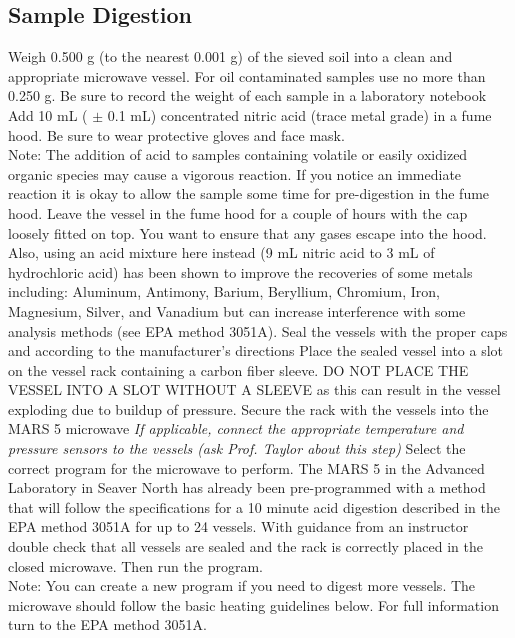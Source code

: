 \documentclass[12pt]{../SOP3_beta}\usepackage[]{graphicx}\usepackage[]{color}
\begin{document}
\subsection{Sample Digestion}

  \NP	Weigh 0.500 g (to the nearest 0.001 g) of the sieved soil into a clean and appropriate microwave vessel. For oil contaminated samples use no more than 0.250 g. Be sure to record the weight of each sample in a laboratory notebook
  \NP	Add 10 mL ( $\pm$ 0.1 mL) concentrated nitric acid (trace metal grade) in a fume hood. Be sure to wear protective gloves and face mask. \\ Note: The addition of acid to samples containing volatile or easily oxidized organic species may cause a vigorous reaction. If you notice an immediate reaction it is okay to allow the sample some time for pre-digestion in the fume hood. Leave the vessel in the fume hood for a couple of hours with the cap loosely fitted on top. You want to ensure that any gases escape into the hood. Also, using an acid mixture here instead (9 mL nitric acid to 3 mL of hydrochloric acid) has been shown to improve the recoveries of some metals including: Aluminum, Antimony, Barium, Beryllium, Chromium, Iron, Magnesium, Silver, and Vanadium but can increase interference with some analysis methods (see EPA method 3051A). 
  \NP Seal the vessels with the proper caps and according to the manufacturer’s directions
  \NP Place the sealed vessel into a slot on the vessel rack containing a carbon fiber sleeve. DO NOT PLACE THE VESSEL INTO A SLOT WITHOUT A SLEEVE as this can result in the vessel exploding due to buildup of pressure. 
  \NP Secure the rack with the vessels into the MARS 5 microwave
  \NP \emph{If applicable, connect the appropriate temperature and pressure sensors to the vessels (ask Prof. Taylor about this step)}
  \NP Select the correct program for the microwave to perform. The MARS 5 in the Advanced Laboratory in Seaver North has already been pre-programmed with a method that will follow the specifications for a 10 minute acid digestion described in the EPA method 3051A for up to 24 vessels. With guidance from an instructor double check that all vessels are sealed and the rack is correctly placed in the closed microwave. Then run the program. \vspace{4mm} \\
  
Note: You can create a new program if you need to digest more vessels. The microwave should follow the basic heating guidelines below. For full information turn to the EPA method 3051A. 
\end{document}
